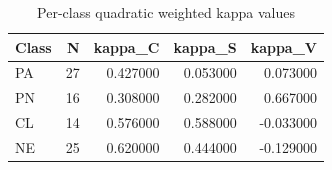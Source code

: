 \begin{table}
\caption{Per-class quadratic weighted kappa values}
\label{tab:rq1-class-kappa}
\begin{tabular}{lrrrr}
\toprule
Class & N & kappa\_C & kappa\_S & kappa\_V \\
\midrule
PA & 27 & 0.427000 & 0.053000 & 0.073000 \\
PN & 16 & 0.308000 & 0.282000 & 0.667000 \\
CL & 14 & 0.576000 & 0.588000 & -0.033000 \\
NE & 25 & 0.620000 & 0.444000 & -0.129000 \\
\bottomrule
\end{tabular}
\end{table}
